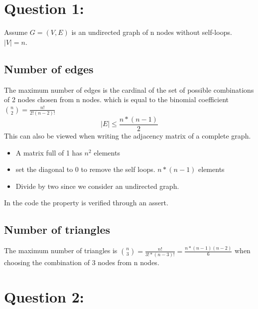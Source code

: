 \documentclass[a4paper]{article}
\begin{document}
\section{Question 1:}
Assume $G = (V, E)$ is an undirected graph of n nodes without self-loops. $|V|=n$.
\subsection*{Number of edges}
The maximum number of edges is the cardinal of the set of possible combinations of 2 nodes chosen from n nodes.
which is equal to the binomial coefficient $\binom{n}{2} = \frac{n!}{2! (n-2)!}$
\begin{equation}\label{eq 1.1}
|E| \leq \frac{n*(n-1)}{2}
\end{equation}
This can also be viewed when writing the adjacency matrix of a complete graph.
\begin{itemize}
    \item  A matrix full of 1 has $n^2$ elements
    \item set the diagonal to 0 to remove the self loops. $n*(n-1)$ elements
    \item Divide by two since we consider an undirected graph.
\end{itemize}


In the code the property is verified through an assert.

\subsection*{Number of triangles}
The maximum number of triangles is $\binom{n}{3} = \frac{n!}{3! * (n-3)!} = \frac{n*(n-1)(n-2)}{6}$ 
when choosing the combination of 3 nodes from n nodes.


\section{Question 2:}



\end{document}
